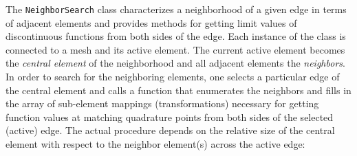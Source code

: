 The \lstinline[basicstyle=\ttfamily]{NeighborSearch} class characterizes a neighborhood of a given edge in terms of adjacent
elements and provides methods for getting limit values of discontinuous functions from both sides of the edge. Each instance of the
class is connected to a mesh and its active element. The current active element becomes the \textit{central element} of
the neighborhood and all adjacent elements the \textit{neighbors}. In order to search for the neighboring elements, one
selects a particular edge of the central element and calls a function that enumerates the neighbors and fills in the
array of sub-element mappings (transformations) necessary for getting function values at matching quadrature points
from both sides of the selected (active) edge.
The actual procedure depends on the relative size of the central element with respect to the neighbor element(s) across
the active edge:
